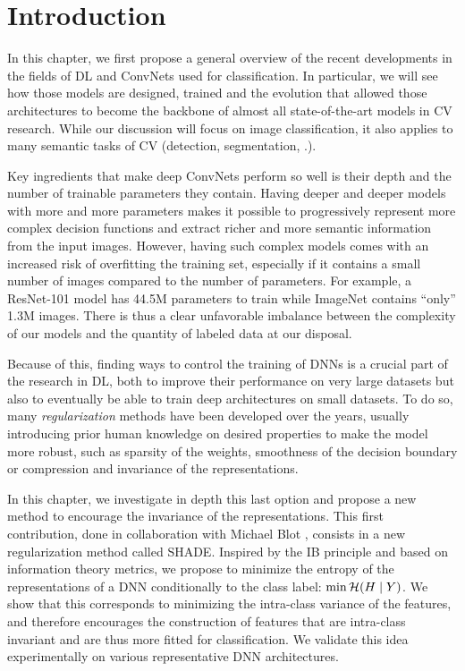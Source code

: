 \newpage

\minitoc
{}

\acresetall

\section{Introduction}

In this chapter, we first propose a general overview of the recent developments in the fields of \acf{DL} and \acfp{ConvNet} used for classification. In particular, we will see how those models are designed, trained and the evolution that allowed those architectures to become the backbone of almost all state-of-the-art models in \ac{CV} research. While our discussion will focus on image classification, it also applies to many semantic tasks of \ac{CV} (detection, segmentation, \etc.).

Key ingredients that make deep \acp{ConvNet} perform so well is their depth and the number of trainable parameters they contain. Having deeper and deeper models with more and more parameters makes it possible to progressively represent more complex decision functions and extract richer and more semantic information from the input images. However, having such complex models comes with an increased risk of overfitting the training set, especially if it contains a small number of images compared to the number of parameters. For example, a ResNet-101 \citep{resnet} model has 44.5M parameters to train while ImageNet contains ``only'' 1.3M images. There is thus a clear unfavorable imbalance between the complexity of our models and the quantity of labeled data at our disposal.

Because of this, finding ways to control the training of \acp{DNN} is a crucial part of the research in \ac{DL}, both to improve their performance on very large datasets but also to eventually be able to train deep architectures on small datasets. To do so, many \textit{regularization} methods have been developed over the years, usually introducing prior human knowledge on desired properties to make the model more robust, such as sparsity of the weights, smoothness of the decision boundary or compression and invariance of the representations.

In this chapter, we investigate in depth this last option and propose a new method to encourage the invariance of the representations. This first contribution, done in collaboration with Michael Blot \citep{blothese}, consists in a new regularization method called {\acs{SHADE}}. Inspired by the \ac{IB} principle \citep{IB} and based on information theory metrics, we propose to minimize the entropy of the representations of a \ac{DNN} conditionally to the class label: $\min \mathcal{H}(H\mid Y)$. We show that this corresponds to minimizing the intra-class variance of the features, and therefore encourages the construction of features that are intra-class invariant and are thus more fitted for classification. We validate this idea experimentally on various representative \ac{DNN} architectures.

